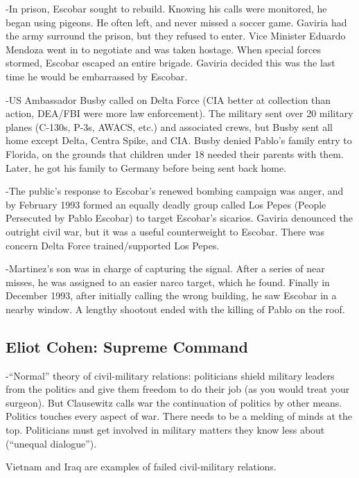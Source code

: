 \documentclass[
]{article}
\begin{document}
-In prison, Escobar sought to rebuild. Knowing his calls were monitored,
he began using pigeons. He often left, and never missed a soccer game.
Gaviria had the army surround the prison, but they refused to enter.
Vice Minister Eduardo Mendoza went in to negotiate and was taken
hostage. When special forces stormed, Escobar escaped an entire brigade.
Gaviria decided this was the last time he would be embarrassed by
Escobar.

-US Ambassador Busby called on Delta Force (CIA better at collection
than action, DEA/FBI were more law enforcement). The military sent over
20 military planes (C-130s, P-3s, AWACS, etc.) and associated crews, but
Busby sent all home except Delta, Centra Spike, and CIA. Busby denied
Pablo's family entry to Florida, on the grounds that children under 18
needed their parents with them. Later, he got his family to Germany
before being sent back home.

-The public's response to Escobar's renewed bombing campaign was anger,
and by February 1993 formed an equally deadly group called Los Pepes
(People Persecuted by Pablo Escobar) to target Escobar's sicarios.
Gaviria denounced the outright civil war, but it was a useful
counterweight to Escobar. There was concern Delta Force
trained/supported Los Pepes.

-Martinez's son was in charge of capturing the signal. After a series of
near misses, he was assigned to an easier narco target, which he found.
Finally in December 1993, after initially calling the wrong building, he
saw Escobar in a nearby window. A lengthy shootout ended with the
killing of Pablo on the roof.

\hypertarget{eliot-cohen-supreme-command}{%
\subsection{Eliot Cohen: Supreme
Command}\label{eliot-cohen-supreme-command}}

-``Normal'' theory of civil-military relations: politicians shield
military leaders from the politics and give them freedom to do their job
(as you would treat your surgeon). But Clausewitz calls war the
continuation of politics by other means. Politics touches every aspect
of war. There needs to be a melding of minds at the top. Politicians
must get involved in military matters they know less about (``unequal
dialogue'').

Vietnam and Iraq are examples of failed civil-military relations.
\end{document}

